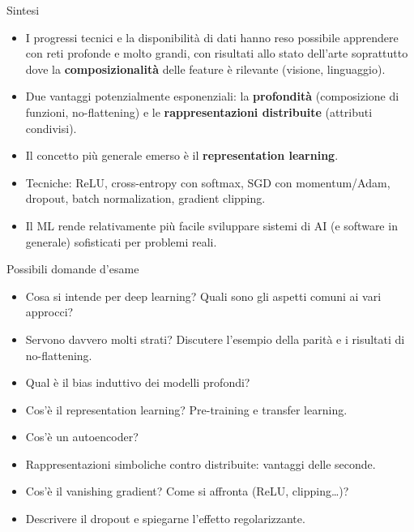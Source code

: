 \begin{boxabstract}{Sintesi}

\begin{itemize}
\tightlist
\item
  I progressi tecnici e la disponibilità di dati hanno reso possibile
  apprendere con reti profonde e molto grandi, con risultati allo stato
  dell'arte soprattutto dove la \textbf{composizionalità} delle feature
  è rilevante (visione, linguaggio).
\item
  Due vantaggi potenzialmente esponenziali: la \textbf{profondità}
  (composizione di funzioni, no-flattening) e le
  \textbf{rappresentazioni distribuite} (attributi condivisi).
\item
  Il concetto più generale emerso è il \textbf{representation learning}.
\item
  Tecniche: ReLU, cross-entropy con softmax, SGD con momentum/Adam,
  dropout, batch normalization, gradient clipping.
\item
  Il ML rende relativamente più facile sviluppare sistemi di AI (e
  software in generale) sofisticati per problemi reali.
\end{itemize}

\end{boxabstract}

\begin{boxquestion}{Possibili domande d'esame}

\begin{itemize}
\tightlist
\item
  Cosa si intende per deep learning? Quali sono gli aspetti comuni ai
  vari approcci?
\item
  Servono davvero molti strati? Discutere l'esempio della parità e i
  risultati di no-flattening.
\item
  Qual è il bias induttivo dei modelli profondi?
\item
  Cos'è il representation learning? Pre-training e transfer learning.
\item
  Cos'è un autoencoder?
\item
  Rappresentazioni simboliche contro distribuite: vantaggi delle
  seconde.
\item
  Cos'è il vanishing gradient? Come si affronta (ReLU, clipping\ldots)?
\item
  Descrivere il dropout e spiegarne l'effetto regolarizzante.
\end{itemize}

\end{boxquestion}
